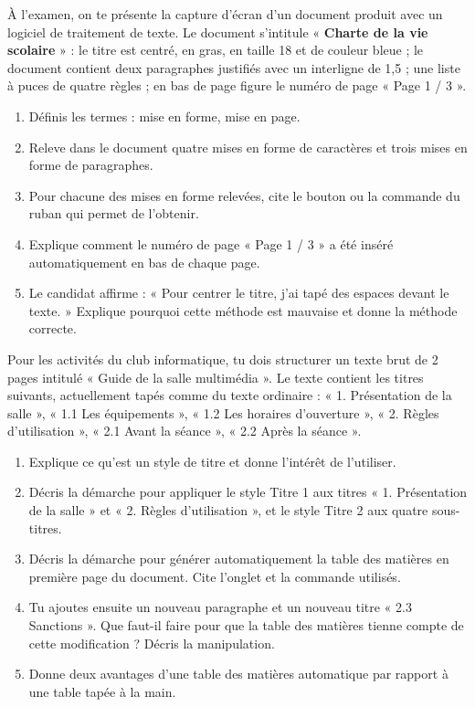 \documentclass[11pt]{article}
\newcommand{\cle}[1]{{\popxbold\color{popdark}#1}}
\newcounter{popsec}
\newcounter{popsub}
\newcommand{\courssub}[1]{%
  \stepcounter{popsub}%
  \par\vspace{9pt}\noindent{\popxbold\fontsize{11.5}{13}\selectfont\color{popink}{\color{poporange}\thepopsec.\thepopsub}\hspace{6pt}#1}\par\nopagebreak\vspace{4pt}
}
\begin{document}
\courssub{Je me prépare au BEPC}

\begin{exercice}
À l'examen, on te présente la capture d'écran d'un document produit avec un logiciel de traitement de texte. Le document s'intitule « \textbf{\Large Charte de la vie scolaire} » : le titre est centré, en gras, en taille 18 et de couleur bleue ; le document contient deux paragraphes justifiés avec un interligne de 1,5 ; une liste à puces de quatre règles ; en bas de page figure le numéro de page « Page 1 / 3 ».
\begin{enumerate}
\item Définis les termes : mise en forme, mise en page.
\item Releve dans le document quatre mises en forme de caractères et trois mises en forme de paragraphes.
\item Pour chacune des mises en forme relevées, cite le bouton ou la commande du ruban qui permet de l'obtenir.
\item Explique comment le numéro de page « Page 1 / 3 » a été inséré automatiquement en bas de chaque page.
\item Le candidat affirme : « Pour centrer le titre, j'ai tapé des espaces devant le texte. » Explique pourquoi cette méthode est mauvaise et donne la méthode correcte.
\end{enumerate}
\end{exercice}

\begin{exercice}
Pour les activités du club informatique, tu dois structurer un texte brut de 2 pages intitulé « Guide de la salle multimédia ». Le texte contient les titres suivants, actuellement tapés comme du texte ordinaire : « 1. Présentation de la salle », « 1.1 Les équipements », « 1.2 Les horaires d'ouverture », « 2. Règles d'utilisation », « 2.1 Avant la séance », « 2.2 Après la séance ».
\begin{enumerate}
\item Explique ce qu'est un style de titre et donne l'intérêt de l'utiliser.
\item Décris la démarche pour appliquer le style \cle{Titre 1} aux titres « 1. Présentation de la salle » et « 2. Règles d'utilisation », et le style \cle{Titre 2} aux quatre sous-titres.
\item Décris la démarche pour générer automatiquement la table des matières en première page du document. Cite l'onglet et la commande utilisés.
\item Tu ajoutes ensuite un nouveau paragraphe et un nouveau titre « 2.3 Sanctions ». Que faut-il faire pour que la table des matières tienne compte de cette modification ? Décris la manipulation.
\item Donne deux avantages d'une table des matières automatique par rapport à une table tapée à la main.
\end{enumerate}
\end{exercice}
\end{document}
